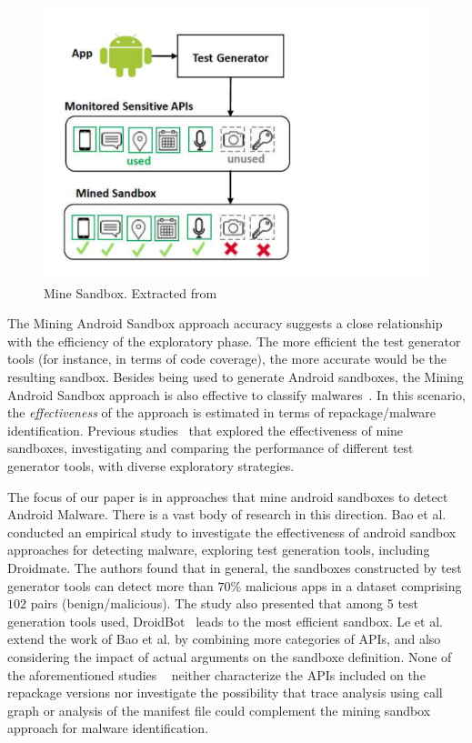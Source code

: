 \begin{figure}[ht]
\centering
\includegraphics[scale=0.30]{images/mineSandbox.pdf}
\caption{Mine Sandbox. Extracted from~\cite{DBLP:conf/wcre/BaoLL18}}
 \label{fig:mineSandbox}
\end{figure}

The Mining Android Sandbox approach accuracy suggests a close relationship with the
efficiency of the exploratory phase. The more efficient the test generator
tools (for instance, in terms of code coverage), the more accurate would be the resulting
sandbox. Besides being used to generate Android sandboxes, the Mining Android Sandbox approach is also effective 
to classify malwares~\cite{DBLP:conf/wcre/BaoLL18}.  In this scenario, the \emph{effectiveness} of the approach
is estimated in terms of repackage/malware identification.
Previous studies~\cite{DBLP:conf/wcre/BaoLL18,DBLP:conf/scam/CostaMCMVBC20} that explored the effectiveness of mine sandboxes,
investigating and comparing the performance of different test generator tools,
with diverse exploratory strategies.


The focus of our paper is in approaches that mine android sandboxes to detect Android Malware.
There is a vast body of research in this direction. 
Bao et al.~\cite{DBLP:conf/wcre/BaoLL18} conducted an empirical study to investigate the effectiveness of android sandbox approaches
for detecting malware, exploring test generation tools, including Droidmate. The authors found that in general, the sandboxes constructed by test generator tools can detect more than $70$\% malicious apps in a dataset comprising $102$ pairs (benign/malicious). The study also presented that among 5 test generation tools used, DroidBot~\cite{DBLP:conf/icse/LiYGC17} leads to the most efficient sandbox.
Le et al.~\cite{le2018towards} extend the work of Bao et al. by combining more categories of APIs, and also considering the impact of
actual arguments on the sandboxe definition.
None of the aforementioned studies ~\cite{DBLP:conf/icse/JamrozikSZ16,DBLP:conf/wcre/BaoLL18,le2018towards} neither characterize the APIs included on the repackage versions nor investigate the possibility that trace analysis using call graph or analysis of the manifest file could complement the mining sandbox approach for malware identification.

